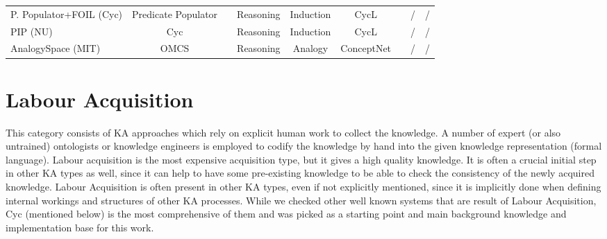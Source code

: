 \begin{landscape}
\begin{table}[htb]
\begin{adjustbox}{width=1.6\textwidth}
\begin{tabular}{lclcccccc}
	    P. Populator+FOIL (Cyc) & Predicate Populator & \parencite{Witbrock2005} & Reasoning & Induction &  CycL & \checkmark & / & / \\
	    PIP (NU) & Cyc & \parencite{Sharma2010} & Reasoning & Induction &  CycL & \checkmark & / & / \\
	    AnalogySpace (MIT) & OMCS & \parencite{Speer2008} & Reasoning & Analogy &  ConceptNet & \checkmark & / & / \\
		\hline
	\end{tabular}
	\end{adjustbox}
\end{table}
\end{landscape}

\section{Labour Acquisition}
\label{section:LabourAcquisition}
This category consists of KA approaches which rely on explicit human work to 
collect the knowledge. A number of expert (or also untrained) ontologists or 
knowledge engineers is employed to codify the knowledge by hand into the given 
knowledge representation (formal language). Labour acquisition is the most 
expensive acquisition type, but it gives a high quality knowledge. It is often a
crucial initial step in other KA types as well, since it can help to have some 
pre-existing knowledge to be able to check the consistency of the newly acquired
knowledge. Labour Acquisition is often present in other KA types, even if not 
explicitly mentioned, since it is implicitly done when defining internal 
workings and structures of other KA processes. While we checked other well 
known systems that are result of Labour Acquisition, Cyc (mentioned below) is 
the most comprehensive of them and was picked as a starting point and main 
background knowledge and implementation base for this work.


